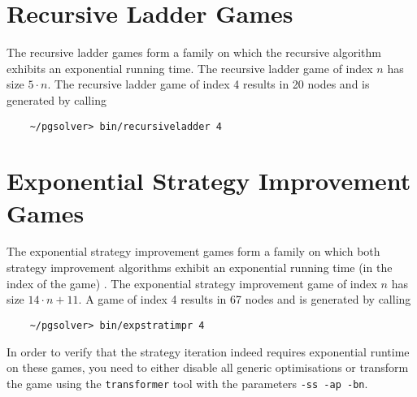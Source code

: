 


\section{Recursive Ladder Games}

%


The recursive ladder games form a family on which the recursive algorithm exhibits an exponential
running time.  The recursive ladder game of index $n$ has size $5 \cdot n$. 
The recursive ladder game of index 4 results in 20 nodes and is generated by calling
\begin{verbatim}
    ~/pgsolver> bin/recursiveladder 4
\end{verbatim}





\section{Exponential Strategy Improvement Games}

The exponential strategy improvement games form a family on which both strategy improvement algorithms
exhibit an exponential running time (in the index of the game) \cite{FriedmannSI09}.
The exponential strategy improvement game of index $n$ has size $14 \cdot n + 11$. 
A game of index 4 results in 67 nodes and is generated by calling
\begin{verbatim}
    ~/pgsolver> bin/expstratimpr 4
\end{verbatim}

In order to verify that the strategy iteration indeed requires exponential runtime on these games, you
need to either disable all generic optimisations or transform the game using the \texttt{transformer}
tool with the parameters \texttt{-ss -ap -bn}.


